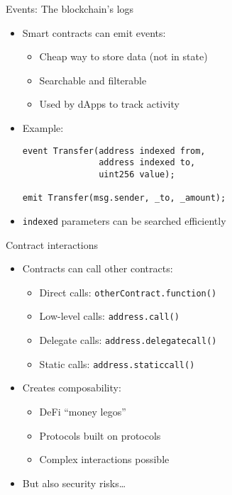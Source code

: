\documentclass[aspectratio=169, lualatex, handout]{beamer}
\begin{document}
\begin{frame}[fragile]{Events: The blockchain's logs}
	\begin{itemize}
		\item Smart contracts can emit events:
		      \begin{itemize}
			      \item Cheap way to store data (not in state)
			      \item Searchable and filterable
			      \item Used by dApps to track activity
		      \end{itemize}
		\item Example:
		      \begin{verbatim}
event Transfer(address indexed from,
               address indexed to,
               uint256 value);

emit Transfer(msg.sender, _to, _amount);
        \end{verbatim}
		\item \texttt{indexed} parameters can be searched efficiently
	\end{itemize}
\end{frame}

\begin{frame}{Contract interactions}
	\begin{itemize}
		\item Contracts can call other contracts:
		      \begin{itemize}
			      \item Direct calls: \texttt{otherContract.function()}
			      \item Low-level calls: \texttt{address.call()}
			      \item Delegate calls: \texttt{address.delegatecall()}
			      \item Static calls: \texttt{address.staticcall()}
		      \end{itemize}
		\item Creates composability:
		      \begin{itemize}
			      \item DeFi ``money legos''
			      \item Protocols built on protocols
			      \item Complex interactions possible
		      \end{itemize}
		\item But also security risks\ldots
	\end{itemize}
\end{frame}
\end{document}
